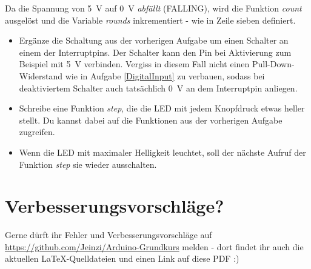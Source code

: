 \documentclass[10pt,a4paper]{article}
\begin{document}
Da die Spannung von \SI{5}{V} auf \SI{0}{V} \emph{abfällt} (FALLING), wird die Funktion \emph{count} ausgelöst und die Variable \emph{rounds} inkrementiert - wie in Zeile sieben definiert.

\begin{itemize}
	\item Ergänze die Schaltung aus der vorherigen Aufgabe um einen Schalter an einem der Interruptpins. Der Schalter kann den Pin bei Aktivierung zum Beispiel mit \SI{5}{V} verbinden. Vergiss in diesem Fall nicht einen Pull-Down-Widerstand wie in Aufgabe \ref{DigitalInput} zu verbauen, sodass bei deaktiviertem Schalter auch tatsächlich \SI{0}{V} an dem Interruptpin anliegen.
	\item Schreibe eine Funktion \textit{step}, die die LED mit jedem Knopfdruck etwas heller stellt. Du kannst dabei auf die Funktionen aus der vorherigen Aufgabe zugreifen.
	\item Wenn die LED mit maximaler Helligkeit leuchtet, soll der nächste Aufruf der Funktion \textit{step} sie wieder ausschalten.
\end{itemize}





\bigskip
\section*{Verbesserungsvorschläge?}
Gerne dürft ihr Fehler und Verbesserungsvorschläge auf \url{https://github.com/Jeinzi/Arduino-Grundkurs} melden - dort findet ihr auch die aktuellen \LaTeX-Quelldateien und einen Link auf diese PDF :)
\end{document}
